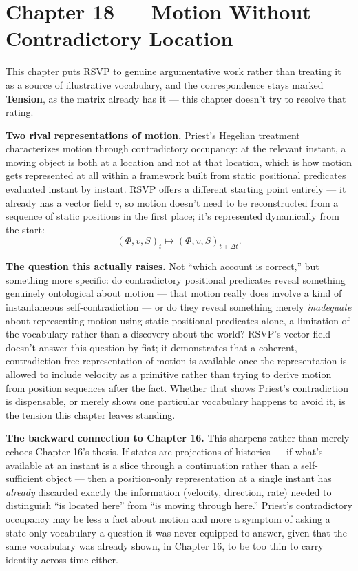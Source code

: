 \hypertarget{chapter-18-motion-without-contradictory-location}{%
\chapter*{Chapter 18 --- Motion Without Contradictory Location}
\label{chapter-18-motion-without-contradictory-location}}

This chapter puts RSVP to genuine argumentative work rather than treating
it as a source of illustrative vocabulary, and the correspondence stays
marked \textbf{Tension}, as the matrix already has it --- this chapter doesn't
try to resolve that rating.

\textbf{Two rival representations of motion.} Priest's Hegelian treatment
characterizes motion through contradictory occupancy: at the relevant
instant, a moving object is both at a location and not at that location,
which is how motion gets represented at all within a framework built from
static positional predicates evaluated instant by instant. RSVP offers a
different starting point entirely --- it already has a vector field \(v\),
so motion doesn't need to be reconstructed from a sequence of static
positions in the first place; it's represented dynamically from the
start:
\[(\Phi, v, S)_t \longmapsto (\Phi, v, S)_{t + \Delta t}.\]

\textbf{The question this actually raises.} Not ``which account is correct,''
but something more specific: do contradictory positional predicates
reveal something genuinely ontological about motion --- that motion really
does involve a kind of instantaneous self-contradiction --- or do they
reveal something merely \emph{inadequate} about representing motion using
static positional predicates alone, a limitation of the vocabulary rather
than a discovery about the world? RSVP's vector field doesn't answer this
question by fiat; it demonstrates that a coherent, contradiction-free
representation of motion is available once the representation is allowed
to include velocity as a primitive rather than trying to derive motion
from position sequences after the fact. Whether that shows Priest's
contradiction is dispensable, or merely shows one particular vocabulary
happens to avoid it, is the tension this chapter leaves standing.

\textbf{The backward connection to Chapter 16.} This sharpens rather than
merely echoes Chapter 16's thesis. If states are projections of
histories --- if what's available at an instant is a slice through a
continuation rather than a self-sufficient object --- then a
position-only representation at a single instant has \emph{already} discarded
exactly the information (velocity, direction, rate) needed to distinguish
``is located here'' from ``is moving through here.'' Priest's contradictory
occupancy may be less a fact about motion and more a symptom of asking a
state-only vocabulary a question it was never equipped to answer, given
that the same vocabulary was already shown, in Chapter 16, to be too thin
to carry identity across time either.

